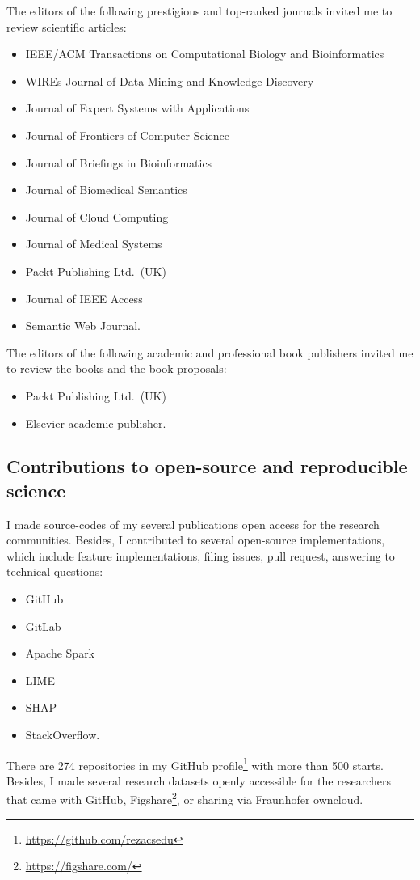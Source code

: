 \begin{appendices}
The editors of the following prestigious and top-ranked journals invited me to review scientific articles: 

\begin{itemize}[noitemsep]
    \item IEEE/ACM Transactions on Computational Biology and Bioinformatics
    \item WIREs Journal of Data Mining and Knowledge Discovery
    \item Journal of Expert Systems with Applications 
    \item Journal of Frontiers of Computer Science
    \item Journal of Briefings in Bioinformatics
    \item Journal of Biomedical Semantics
    \item Journal of Cloud Computing
    \item Journal of Medical Systems
    \item Packt Publishing Ltd.~(UK)
    \item Journal of IEEE Access 
    \item Semantic Web Journal.
\end{itemize}

The editors of the following academic and professional book publishers invited me to review the books and the book proposals: 

\begin{itemize}[noitemsep]
    \item Packt Publishing Ltd.~(UK)
    \item Elsevier academic publisher. 
\end{itemize}

\subsection*{Contributions to open-source and reproducible science %
}%
I made source-codes of my several publications open access for the research communities. Besides, I contributed to several open-source implementations, which include feature implementations, filing issues, pull request, answering to technical questions: 

\begin{itemize}[noitemsep]
    \item GitHub
    \item GitLab
    \item Apache Spark 
    \item LIME
    \item SHAP
    \item StackOverflow.
\end{itemize}

There are 274 repositories in my GitHub profile\footnote{\url{https://github.com/rezacsedu}} with more than 500 starts. Besides, I made several research datasets openly accessible for the researchers that came with GitHub, Figshare\footnote{\url{https://figshare.com/}}, or sharing via Fraunhofer owncloud.

\end{appendices}